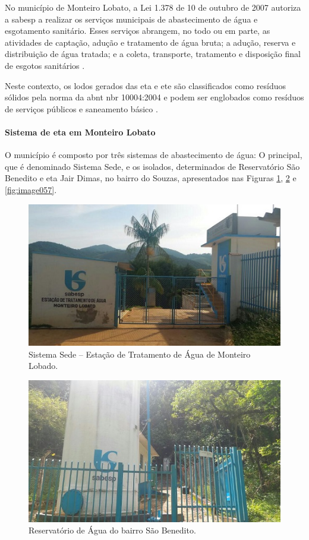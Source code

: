 No município de Monteiro Lobato, a Lei 1.378 de 10 de outubro de 2007 autoriza a \gls{sabesp} a realizar os serviços municipais de abastecimento de água e esgotamento sanitário. Esses serviços abrangem, no todo ou em parte, as atividades de captação, adução e tratamento de água bruta; a adução, reserva e distribuição de água tratada; e a coleta, transporte, tratamento e disposição final de esgotos sanitários \cite{MonteiroLobato2007}.

Neste contexto, os lodos gerados das \gls{eta} e \gls{ete} são classificados como resíduos sólidos pela norma da \gls{abnt} \gls{nbr} 10004:2004 e podem ser englobados como resíduos de serviços públicos e saneamento básico \cite{PERS2014}.

\paragraph{\textbf{Sistema de \gls{eta} em Monteiro Lobato}}

O município é composto por três sistemas de abastecimento de água: O principal, que é denominado Sistema Sede, e os isolados, determinados de Reservatório São Benedito e \gls{eta} Jair Dimas, no bairro do Souzas, apresentados nas Figuras \ref{fig:image055}, \ref{fig:image056} e \ref{fig:image057}. 

\begin{figure}
	\centering
	\includegraphics[width=0.75\linewidth]{produtos/prodtres/image055}
	\caption{Sistema Sede – Estação de Tratamento de Água de Monteiro Lobado.}
	\label{fig:image055}
\end{figure}


\begin{figure}
	\centering
	\includegraphics[width=0.75\linewidth]{produtos/prodtres/image056}
	\caption{Reservatório de Água do bairro São Benedito.}
	\label{fig:image056}
\end{figure}


